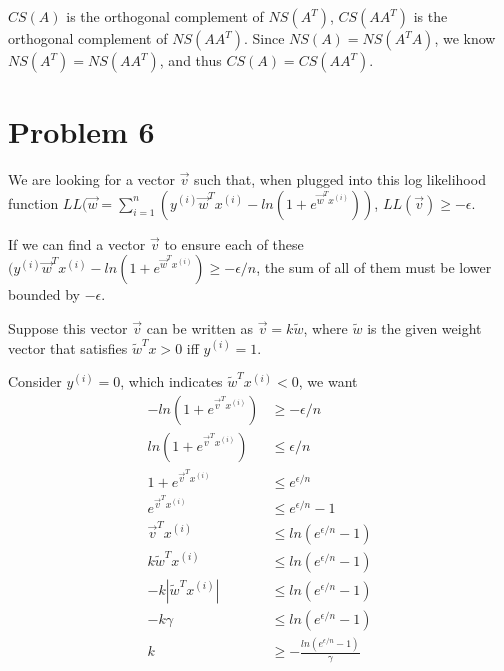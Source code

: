 \documentclass[11pt]{article}
\begin{document}

$CS(A)$ is the orthogonal complement of $NS(A^T)$, $CS(AA^T)$ is the orthogonal complement of $NS(AA^T)$. Since $NS(A)=NS(A^TA)$, we know $NS(A^T)=NS(AA^T)$, and thus $CS(A)=CS(AA^T)$.

\newpage
\section*{Problem 6}
We are looking for a vector $\Vec{v}$ such that, when plugged into this log likelihood function $LL(\Vec{w} = \sum_{i=1}^{n} (y^{(i)}\Vec{w}^T x^{(i)} - ln(1+e^{\Vec{w}^T x^{(i)}}))$, $LL(\Vec{v})\geq -\epsilon$. 

If we can find a vector $\Vec{v}$ to ensure each of these $(y^{(i)}\Vec{w}^T x^{(i)} - ln(1+e^{\Vec{w}^T x^{(i)}}) \geq -\epsilon / n$, the sum of all of them must be lower bounded by $-\epsilon$.

Suppose this vector $\Vec{v}$ can be written as $\Vec{v} = k \widetilde{w}$, where $\widetilde{w}$ is the given weight vector that satisfies $\widetilde{w}^T x>0$ iff $y^{(i)}=1$.

Consider $y^{(i)}=0$, which indicates $\widetilde{w}^T x^{(i)}<0$, we want 
\begin{equation}
    \begin{split}
        - ln(1+e^{\Vec{v}^T x^{(i)}}) &\geq -\epsilon / n \\
        ln(1+e^{\Vec{v}^T x^{(i)}}) &\leq \epsilon / n \\
        1+e^{\Vec{v}^T x^{(i)}} &\leq e^{\epsilon / n} \\
        e^{\Vec{v}^T x^{(i)}} &\leq e^{\epsilon / n}-1 \\
        \Vec{v}^T x^{(i)} &\leq ln(e^{\epsilon / n}-1) \\
        k \widetilde{w}^T x^{(i)} &\leq ln(e^{\epsilon / n}-1)\\
        -k |\widetilde{w}^T x^{(i)}| &\leq ln(e^{\epsilon / n}-1) \\
        -k \gamma &\leq ln(e^{\epsilon / n}-1) \\
        k &\geq -\frac{ln(e^{\epsilon / n}-1)}{\gamma}
    \end{split}
\end{equation}
\end{document}
